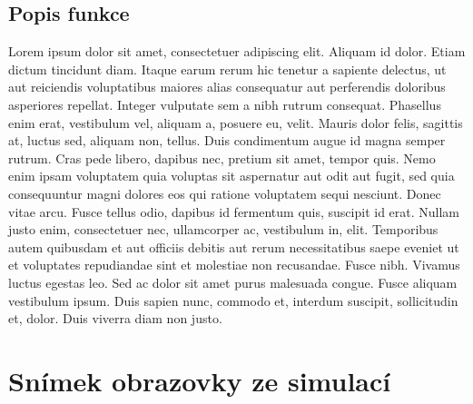 \documentclass[11pt,a4paper,oneside]{article}
\begin{document}
\subsection*{Popis funkce}
Lorem ipsum dolor sit amet, consectetuer adipiscing elit. Aliquam id dolor. Etiam dictum tincidunt diam. Itaque earum rerum hic tenetur a sapiente delectus, ut aut reiciendis voluptatibus maiores alias consequatur aut perferendis doloribus asperiores repellat. Integer vulputate sem a nibh rutrum consequat. Phasellus enim erat, vestibulum vel, aliquam a, posuere eu, velit. Mauris dolor felis, sagittis at, luctus sed, aliquam non, tellus. Duis condimentum augue id magna semper rutrum. Cras pede libero, dapibus nec, pretium sit amet, tempor quis. Nemo enim ipsam voluptatem quia voluptas sit aspernatur aut odit aut fugit, sed quia consequuntur magni dolores eos qui ratione voluptatem sequi nesciunt. Donec vitae arcu. Fusce tellus odio, dapibus id fermentum quis, suscipit id erat. Nullam justo enim, consectetuer nec, ullamcorper ac, vestibulum in, elit. Temporibus autem quibusdam et aut officiis debitis aut rerum necessitatibus saepe eveniet ut et voluptates repudiandae sint et molestiae non recusandae. Fusce nibh. Vivamus luctus egestas leo. Sed ac dolor sit amet purus malesuada congue. Fusce aliquam vestibulum ipsum. Duis sapien nunc, commodo et, interdum suscipit, sollicitudin et, dolor. Duis viverra diam non justo.
\newpage
\section*{Snímek obrazovky ze simulací}
\end{document}
